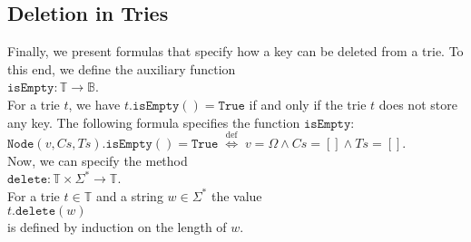 \subsection{Deletion in Tries}
Finally, we present formulas that specify how a key can be deleted from a trie.
To this end, we define the auxiliary function
\\[0.2cm]
\hspace*{1.3cm} 
$\texttt{isEmpty}: \mathbb{T} \rightarrow \mathbb{B}$.
\\[0.2cm]
For a trie $t$, we have $t.\texttt{isEmpty}() = \texttt{True}$ if and only if the trie $t$ does not
store any key.  The following formula specifies the function $\texttt{isEmpty}$:
\\[0.2cm]
\hspace*{1.3cm}
$\texttt{Node}(v, C\!s, T\!s).\texttt{isEmpty}() = \mathtt{True} \;\stackrel{\textrm{def}}{\Longleftrightarrow}\; 
 v = \Omega \wedge C\!s = [] \wedge T\!s = []
$.
\\[0.2cm]
Now, we can specify the method
\\[0.2cm]
\hspace*{1.3cm}
$\texttt{delete}: \mathbb{T} \times \Sigma^* \rightarrow \mathbb{T}$.
\\[0.2cm]
For a trie  $t \in \mathbb{T}$ and a string $w \in \Sigma^*$ the value 
 \\[0.2cm]
\hspace*{1.3cm} 
$t.\texttt{delete}(w)$
\\[0.2cm]
is defined by induction on the length of  $w$.

